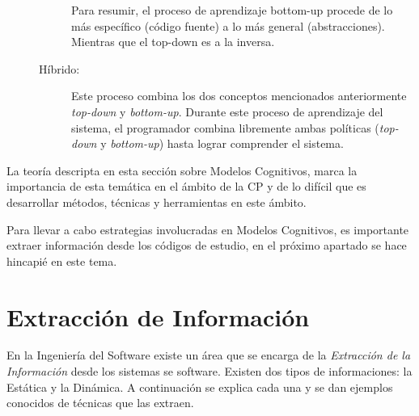 \begin{description}
\begin{description}
Para resumir, el proceso de aprendizaje bottom-up procede de lo más específico (código fuente) a lo más general (abstracciones). Mientras que el top-down es a la inversa.

\item[Híbrido:] Este proceso combina los dos conceptos mencionados anteriormente \textit{top-down} y \textit{bottom-up}. Durante este proceso de aprendizaje del sistema, el programador combina libremente ambas políticas (\textit{top-down} y \textit{bottom-up}) hasta lograr comprender el sistema.
\end{description}
\end{description}


La teoría descripta en esta sección sobre Modelos Cognitivos, marca la importancia de esta temática en el ámbito de la CP y de lo difícil que es desarrollar métodos, técnicas y herramientas en este ámbito.

Para llevar a cabo estrategias involucradas en Modelos Cognitivos, es importante extraer información desde los códigos de estudio, en el próximo apartado se hace hincapié en este tema.

\section{Extracción de Información}

En la Ingeniería del Software existe un área que se encarga de la \textit{Extracción de la Información} desde los sistemas se software. 
Existen dos tipos de informaciones: la Estática y la Dinámica. A continuación se explica cada una y se dan ejemplos conocidos de técnicas que las extraen.

